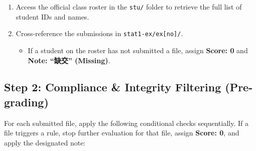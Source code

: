 \documentclass[
]{article}
\providecommand{\tightlist}{%
  \setlength{\itemsep}{0pt}\setlength{\parskip}{0pt}}
\begin{document}
\begin{enumerate}
\def\labelenumi{\arabic{enumi}.}
\tightlist
\item
  Access the official class roster in the \texttt{stu/} folder to
  retrieve the full list of student IDs and names.
\item
  Cross-reference the submissions in \texttt{stat1-ex/ex{[}no{]}/}.

  \begin{itemize}
  \tightlist
  \item
    If a student on the roster has not submitted a file, assign
    \textbf{Score: 0} and \textbf{Note: ``缺交'' (Missing)}.
  \end{itemize}
\end{enumerate}

\subsection{Step 2: Compliance \& Integrity Filtering
(Pre-grading)}\label{step-2-compliance-integrity-filtering-pre-grading}

For each submitted file, apply the following conditional checks
sequentially. If a file triggers a rule, stop further evaluation for
that file, assign \textbf{Score: 0}, and apply the designated note:
\end{document}
